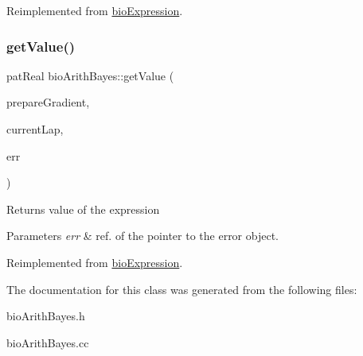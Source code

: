 Reimplemented from \hyperlink{classbio_expression_a91c81ce80c9e972c913b10f5f3c1ed13}{bio\+Expression}.

\mbox{\label{classbio_arith_bayes_a7292ae29cd04168543674b1ae71f4bed}} 
\subsubsection{\texorpdfstring{get\+Value()}{getValue()}}
{\footnotesize\ttfamily pat\+Real bio\+Arith\+Bayes\+::get\+Value (\begin{DoxyParamCaption}\item[{pat\+Boolean}]{prepare\+Gradient,  }\item[{pat\+U\+Long}]{current\+Lap,  }\item[{pat\+Error $\ast$\&}]{err }\end{DoxyParamCaption})\hspace{0.3cm}{\ttfamily [virtual]}}

\begin{DoxyReturn}{Returns}
value of the expression 
\end{DoxyReturn}

\begin{DoxyParams}{Parameters}
{\em err} & ref. of the pointer to the error object. \\
\hline
\end{DoxyParams}


Reimplemented from \hyperlink{classbio_expression_af58662a5d4d456f15bc4f2c9bd4f8a5b}{bio\+Expression}.



The documentation for this class was generated from the following files\+:\begin{DoxyCompactItemize}
\item 
bio\+Arith\+Bayes.\+h\item 
bio\+Arith\+Bayes.\+cc\end{DoxyCompactItemize}
